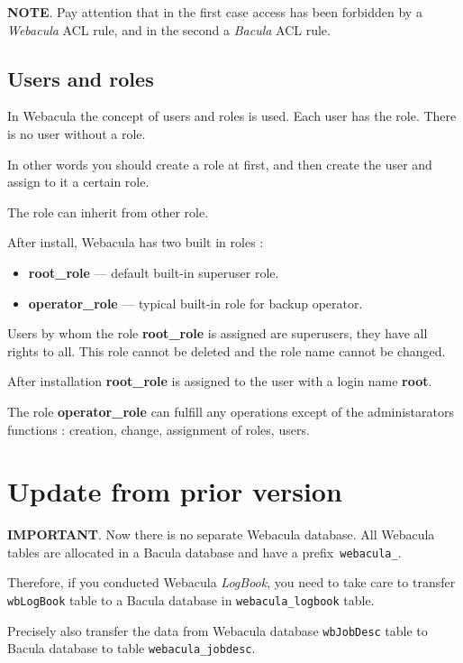 \documentclass[10pt]{article}
\begin{document}
\textbf{NOTE}.
Pay attention that in the first case access has been forbidden by a \textit{Webacula} ACL rule,
and in the second a \textit{Bacula} ACL rule.


\subsection{Users and roles}
\label{Setup:Users and roles}

In Webacula the concept of users and roles is used.
Each user has the role. There is no user without a role.

In other words you should create a role at first, and then create the user and assign to it a certain role.

The role can inherit from other role.

After install, Webacula has two built in roles :

\begin{itemize}
  \item \textbf{root\_role} --- default built-in superuser role.
  \item \textbf{operator\_role} --- typical built-in role for backup operator.
\end{itemize}

Users by whom the role \textbf{root\_role} is assigned are superusers, they have all rights to all.
This role cannot be deleted and the role name cannot be changed.

After installation \textbf{root\_role} is assigned to the user with a login name \textbf{root}.

The role \textbf{operator\_role} can fulfill any operations except of the administarators functions :
creation, change, assignment of roles, users.



\section{Update from prior version}
\label{Update}

\textbf{IMPORTANT}. Now there is no separate Webacula database.
All Webacula tables are allocated in a Bacula database and have a prefix\texttt{ webacula\_}.

Therefore, if you conducted Webacula \textit{LogBook}, you need to take care to transfer \texttt{wbLogBook} table
to a Bacula database in \texttt{webacula\_logbook} table.

Precisely also transfer the data from Webacula database \texttt{wbJobDesc} table
to Bacula database to table \texttt{webacula\_jobdesc}.
\end{document}
